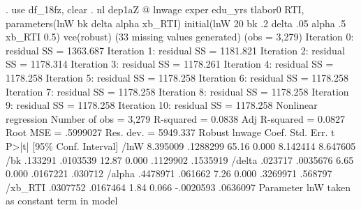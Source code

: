 . use df_18fz, clear
{\smallskip}
. nl dep1aZ @ lnwage exper edu_yrs tlabor0 RTI, parameters(lnW bk delta alpha xb_RTI) initial(lnW 20 bk .2 delta .05 alpha .5 xb_RTI 0.5) vce(robust) 
(33 missing values generated)
(obs = 3,279)
{\smallskip}
Iteration 0:  residual SS =  1363.687
Iteration 1:  residual SS =  1181.821
Iteration 2:  residual SS =  1178.314
Iteration 3:  residual SS =  1178.261
Iteration 4:  residual SS =  1178.258
Iteration 5:  residual SS =  1178.258
Iteration 6:  residual SS =  1178.258
Iteration 7:  residual SS =  1178.258
Iteration 8:  residual SS =  1178.258
Iteration 9:  residual SS =  1178.258
Iteration 10:  residual SS =  1178.258
{\smallskip}
{\smallskip}
Nonlinear regression                                Number of obs =      3,279
                                                    R-squared     =     0.0838
                                                    Adj R-squared =     0.0827
                                                    Root MSE      =   .5999027
                                                    Res. dev.     =   5949.337
{\smallskip}
             {\VBAR}               Robust
      lnwage {\VBAR}      Coef.   Std. Err.      t    P>|t|     [95\% Conf. Interval]
        /lnW {\VBAR}   8.395009   .1288299    65.16   0.000     8.142414    8.647605
         /bk {\VBAR}    .133291   .0103539    12.87   0.000     .1129902    .1535919
      /delta {\VBAR}    .023717   .0035676     6.65   0.000     .0167221     .030712
      /alpha {\VBAR}   .4478971    .061662     7.26   0.000     .3269971     .568797
     /xb_RTI {\VBAR}   .0307752   .0167464     1.84   0.066    -.0020593    .0636097
  Parameter lnW taken as constant term in model
{\smallskip}

